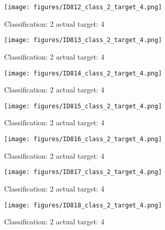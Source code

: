 \begin{figure}[h!]
\begin{center}
\texttt{[image: figures/ID812\_class\_2\_target\_4.png]}
\end{center}
\caption{ Classification: 2 actual target: 4}
\label{fig:ID812_class_2_target_4}
\end{figure}
\begin{figure}[h!]
\begin{center}
\texttt{[image: figures/ID813\_class\_2\_target\_4.png]}
\end{center}
\caption{ Classification: 2 actual target: 4}
\label{fig:ID813_class_2_target_4}
\end{figure}
\begin{figure}[h!]
\begin{center}
\texttt{[image: figures/ID814\_class\_2\_target\_4.png]}
\end{center}
\caption{ Classification: 2 actual target: 4}
\label{fig:ID814_class_2_target_4}
\end{figure}
\begin{figure}[h!]
\begin{center}
\texttt{[image: figures/ID815\_class\_2\_target\_4.png]}
\end{center}
\caption{ Classification: 2 actual target: 4}
\label{fig:ID815_class_2_target_4}
\end{figure}
\begin{figure}[h!]
\begin{center}
\texttt{[image: figures/ID816\_class\_2\_target\_4.png]}
\end{center}
\caption{ Classification: 2 actual target: 4}
\label{fig:ID816_class_2_target_4}
\end{figure}
\begin{figure}[h!]
\begin{center}
\texttt{[image: figures/ID817\_class\_2\_target\_4.png]}
\end{center}
\caption{ Classification: 2 actual target: 4}
\label{fig:ID817_class_2_target_4}
\end{figure}
\begin{figure}[h!]
\begin{center}
\texttt{[image: figures/ID818\_class\_2\_target\_4.png]}
\end{center}
\caption{ Classification: 2 actual target: 4}
\label{fig:ID818_class_2_target_4}
\end{figure}
